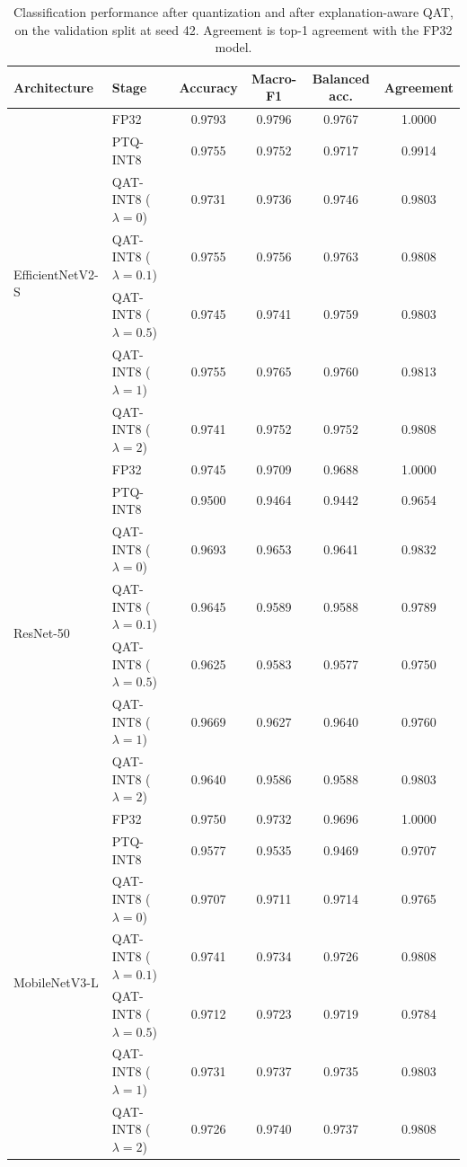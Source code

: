 \documentclass[fleqn,10pt]{wlscirep}
\begin{document}
\begin{table}[!ht]
\centering
\scriptsize
\caption{Classification performance after quantization and after explanation-aware QAT, on the validation split at seed 42. Agreement is top-1 agreement with the FP32 model.}
\label{tab:post_qat}
\setlength{\tabcolsep}{5pt}
\begin{tabular}{ll cccc}
\toprule
\textbf{Architecture} & \textbf{Stage} & \textbf{Accuracy} & \textbf{Macro-F1} & \textbf{Balanced acc.} & \textbf{Agreement} \\
\midrule
\multirow{7}{*}{EfficientNetV2-S}
 & FP32 & 0.9793 & 0.9796 & 0.9767 & 1.0000 \\
 & PTQ-INT8 & 0.9755 & 0.9752 & 0.9717 & 0.9914 \\
 & QAT-INT8 ($\lambda=0$) & 0.9731 & 0.9736 & 0.9746 & 0.9803 \\
 & QAT-INT8 ($\lambda=0.1$) & 0.9755 & 0.9756 & 0.9763 & 0.9808 \\
 & QAT-INT8 ($\lambda=0.5$) & 0.9745 & 0.9741 & 0.9759 & 0.9803 \\
 & QAT-INT8 ($\lambda=1$) & 0.9755 & 0.9765 & 0.9760 & 0.9813 \\
 & QAT-INT8 ($\lambda=2$) & 0.9741 & 0.9752 & 0.9752 & 0.9808 \\
\midrule
\multirow{7}{*}{ResNet-50}
 & FP32 & 0.9745 & 0.9709 & 0.9688 & 1.0000 \\
 & PTQ-INT8 & 0.9500 & 0.9464 & 0.9442 & 0.9654 \\
 & QAT-INT8 ($\lambda=0$) & 0.9693 & 0.9653 & 0.9641 & 0.9832 \\
 & QAT-INT8 ($\lambda=0.1$) & 0.9645 & 0.9589 & 0.9588 & 0.9789 \\
 & QAT-INT8 ($\lambda=0.5$) & 0.9625 & 0.9583 & 0.9577 & 0.9750 \\
 & QAT-INT8 ($\lambda=1$) & 0.9669 & 0.9627 & 0.9640 & 0.9760 \\
 & QAT-INT8 ($\lambda=2$) & 0.9640 & 0.9586 & 0.9588 & 0.9803 \\
\midrule
\multirow{7}{*}{MobileNetV3-L}
 & FP32 & 0.9750 & 0.9732 & 0.9696 & 1.0000 \\
 & PTQ-INT8 & 0.9577 & 0.9535 & 0.9469 & 0.9707 \\
 & QAT-INT8 ($\lambda=0$) & 0.9707 & 0.9711 & 0.9714 & 0.9765 \\
 & QAT-INT8 ($\lambda=0.1$) & 0.9741 & 0.9734 & 0.9726 & 0.9808 \\
 & QAT-INT8 ($\lambda=0.5$) & 0.9712 & 0.9723 & 0.9719 & 0.9784 \\
 & QAT-INT8 ($\lambda=1$) & 0.9731 & 0.9737 & 0.9735 & 0.9803 \\
 & QAT-INT8 ($\lambda=2$) & 0.9726 & 0.9740 & 0.9737 & 0.9808 \\
\bottomrule
\end{tabular}
\end{table}
\end{document}
